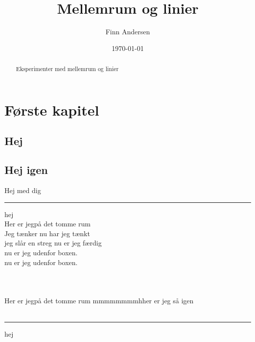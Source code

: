 \documentclass{article}
\title{Mellemrum og linier}
\author{Finn Andersen}
\date{\today}
\begin{document}
\maketitle
\thispagestyle{plain} 

\fancyhead{} %
\fancyhead[CO,CE]{\thepage}
\fancyhead[RO,RE]{\rightmark}
\fancyfoot{} %
\fancyfoot[CO,CE]{\thepage}

\pagestyle{fancy} 

\begin{abstract}
Eksperimenter med mellemrum og linier
\end{abstract}

\section{Første kapitel}
\subsection{Hej}

\subsection{Hej igen}
Hej med dig
\\[5pt]
\hspace{5cm}
\rule {5cm}{10pt}
{\color{red}{\rule{5cm}{10pt}}}
hej \\[5pt]
Her er jeg\hfill på det tomme rum\\
Jeg tænker \dotfill nu har jeg tænkt\\
jeg slår en streg \hrulefill{ }nu er jeg færdig\\
nu er jeg udenfor boxen.\\
nu er jeg udenfor boxen.\\
\makebox[0.5\columnwidth]{\dotfill}\\
\makebox[0.5\columnwidth]{\hrulefill}\\
\makebox[0.5\columnwidth]{\color{red}{\hrulefill}}\\
Her er jeg\hfill på det tomme rum mmmmmmmmh\hfill her er jeg så igen\\
\\[5pt]
\hspace{5cm}
\rule {5cm}{10pt}
{\color{white}{\rule{5cm}{10pt}}}
hej \\[5pt]
\end{document}
